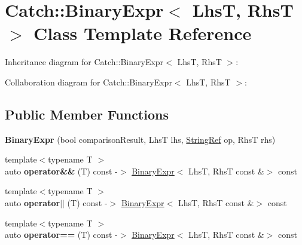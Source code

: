 \hypertarget{classCatch_1_1BinaryExpr}{}\section{Catch\+:\+:Binary\+Expr$<$ LhsT, RhsT $>$ Class Template Reference}
\label{classCatch_1_1BinaryExpr}


Inheritance diagram for Catch\+:\+:Binary\+Expr$<$ LhsT, RhsT $>$\+:


Collaboration diagram for Catch\+:\+:Binary\+Expr$<$ LhsT, RhsT $>$\+:
\subsection*{Public Member Functions}
\begin{DoxyCompactItemize}
\item 
\mbox{\label{classCatch_1_1BinaryExpr_a657d66346aef97a760c22776fe6008b6}} 
{\bfseries Binary\+Expr} (bool comparison\+Result, LhsT lhs, \hyperlink{classCatch_1_1StringRef}{String\+Ref} op, RhsT rhs)
\item 
\mbox{\label{classCatch_1_1BinaryExpr_ab51d6e5b8303c5777fd5af916e2fafff}} 
{\footnotesize template$<$typename T $>$ }\\auto {\bfseries operator\&\&} (T) const -\/$>$ \hyperlink{classCatch_1_1BinaryExpr}{Binary\+Expr}$<$ LhsT, RhsT const \&$>$ const
\item 
\mbox{\label{classCatch_1_1BinaryExpr_a44234233ad4fa42e7c95b6a0d94af9db}} 
{\footnotesize template$<$typename T $>$ }\\auto {\bfseries operator$\vert$$\vert$} (T) const -\/$>$ \hyperlink{classCatch_1_1BinaryExpr}{Binary\+Expr}$<$ LhsT, RhsT const \&$>$ const
\item 
\mbox{\label{classCatch_1_1BinaryExpr_a56d7983b7c826c4924423618ffb40e44}} 
{\footnotesize template$<$typename T $>$ }\\auto {\bfseries operator==} (T) const -\/$>$ \hyperlink{classCatch_1_1BinaryExpr}{Binary\+Expr}$<$ LhsT, RhsT const \&$>$ const
\item 
\mbox{\label{classCatch_1_1BinaryExpr_a1c5d4b87cc18452ebe1254e0067dd476}} 

\end{DoxyCompactItemize}
